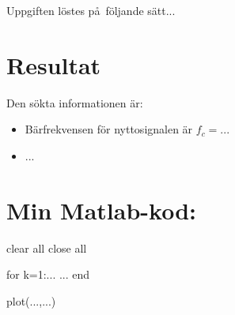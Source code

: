 \documentclass[10pt,twocolumn]{article}
\begin{document}
Uppgiften l\"ostes p\aa\ f\"oljande s\"att...

\section{Resultat}

Den sökta informationen \"ar:
\begin{itemize}
\item B\"arfrekvensen f\"or nyttosignalen \"ar $f_c=...$
\item ...
\end{itemize}

\clearpage

\section*{Min Matlab-kod:}
\begin{spverbatim}
clear all
close all

for k=1:...
  ...
end

plot(...,...)
\end{spverbatim}
\end{document}
